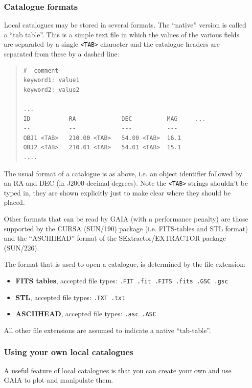 \documentclass[twoside,11pt]{article}
\newcommand{\xref}[3]{#1}
\renewcommand{\_}{\texttt{\symbol{95}}}
\newcommand{\mytt}[1]{{\tt{#1}}}
\begin{document}
\subsubsection{Catalogue formats}
Local catalogues may be stored in several formats. The ``native''
version is called a ``tab table''. This is a simple text file in which
the values of the various fields are separated by a single
\mytt{<TAB>} character and the catalogue headers are separated from
these by a dashed line:
\begin{quote}
\begin{verbatim}
#  comment
keyword1: value1
keyword2: value2

...
ID           RA             DEC          MAG     ...
--           --             ---          ---
OBJ1 <TAB>   210.00 <TAB>   54.00 <TAB>  16.1
OBJ2 <TAB>   210.01 <TAB>   54.01 <TAB>  15.1
....
\end{verbatim}
\end{quote}
The usual format of a catalogue is as above, i.e. an object identifier
followed by an RA and DEC (in J2000 decimal degrees). Note the
\mytt{<TAB>} strings shouldn't be typed in, they are shown explicitly
just to make clear where they should be placed.

Other formats that can be read by GAIA (with a performance penalty)
are those supported by the CURSA (\xref{SUN/190}{sun190}{}) package
(i.e. FITS-tables and STL format) and the ``ASCII\_HEAD'' format of
the SExtractor/EXTRACTOR package (\xref{SUN/226}{sun226}{}).

The format that is used to open a catalogue, is determined by the file
extension:
\begin{itemize}
\item \textbf{FITS tables}, accepted file types: \texttt{.FIT .fit .FITS .fits .GSC .gsc}
\item \textbf{STL}, accepted file types: \texttt{.TXT .txt}
\item \textbf{ASCII\_HEAD}, accepted file types: \texttt{.asc .ASC}
\end{itemize}
All other file extensions are assumed to indicate a native ``tab-table''.

\subsubsection{Using your own local catalogues}
A useful feature of local catalogues is that you can create your own
and use GAIA to plot and manipulate them.
\end{document}
